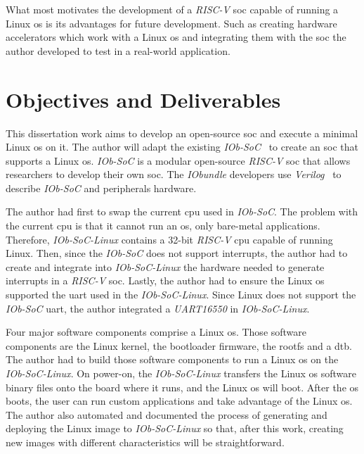 What most motivates the development of a \textit{RISC-V} \acrshort{soc} capable of running a Linux \acrshort{os} is its advantages for future development. Such as creating hardware accelerators which work with a Linux \acrshort{os} and integrating them with the \acrshort{soc} the author developed to test in a real-world application.

\section{Objectives and Deliverables}
\label{section:objectives}
This dissertation work aims to develop an open-source \acrshort{soc} and execute a minimal Linux \acrshort{os} on it. The author will adapt the existing \textit{IOb-SoC}~\cite{iob_soc} to create an \acrshort{soc} that supports a Linux \acrshort{os}. \textit{IOb-SoC} is a modular open-source \textit{RISC-V} \acrshort{soc} that allows researchers to develop their own \acrshort{soc}. The \textit{IObundle} developers use \textit{Verilog}~\cite{thomas2008verilog} to describe \textit{IOb-SoC} and peripherals hardware.

The author had first to swap the current \acrshort{cpu} used in \textit{IOb-SoC}. The problem with the current \acrshort{cpu} is that it cannot run an \acrshort{os}, only bare-metal applications. Therefore, \textit{IOb-SoC-Linux} contains a 32-bit \textit{RISC-V} \acrshort{cpu} capable of running Linux. Then, since the \textit{IOb-SoC} does not support interrupts, the author had to create and integrate into \textit{IOb-SoC-Linux} the hardware needed to generate interrupts in a \textit{RISC-V} \acrshort{soc}. Lastly, the author had to ensure the Linux \acrshort{os} supported the \acrshort{uart} used in the \textit{IOb-SoC-Linux}. Since Linux does not support the \textit{IOb-SoC} \acrshort{uart}, the author integrated a \textit{UART16550} in \textit{IOb-SoC-Linux}.

Four major software components comprise a Linux \acrshort{os}. Those software components are the Linux kernel, the bootloader firmware, the \acrfull{rootfs} and a \acrfull{dtb}. The author had to build those software components to run a Linux \acrshort{os} on the \textit{IOb-SoC-Linux}. On power-on, the \textit{IOb-SoC-Linux} transfers the Linux \acrshort{os} software binary files onto the board where it runs, and the Linux \acrshort{os} will boot. After the \acrshort{os} boots, the user can run custom applications and take advantage of the Linux \acrshort{os}. The author also automated and documented the process of generating and deploying the Linux image to \textit{IOb-SoC-Linux} so that, after this work, creating new images with different characteristics will be straightforward.

